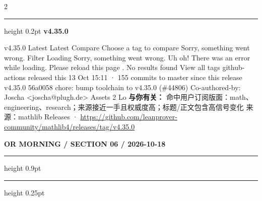\documentclass[10.5pt]{ctexart}
\begin{document}
\begin{multicols}{2}
\vspace{2mm}
\hrule height 0.2pt
\vspace{2mm}
{\large\bfseries v4.35.0}\par
v4.35.0 Latest Latest Compare Choose a tag to compare Sorry, something went wrong. Filter Loading Sorry, something went wrong. Uh oh! There was an error while loading. Please reload this page . No results found View all tags github-actions released this 13 Oct 15:11 · 155 commits to master since this release v4.35.0 56a0058 chore: bump toolchain to v4.35.0 (\#44806) Co-authored-by: Joscha <joscha@plugh.de> Assets 2 Lo
\textbf{与你有关：} 命中用户订阅版面：math、engineering、research；来源接近一手且权威度高；标题/正文包含高信号变化
{\footnotesize\color{ormuted} 来源：mathlib Releases · \url{https://github.com/leanprover-community/mathlib4/releases/tag/v4.35.0}}
\end{multicols}
\newpage
{\small\bfseries OR MORNING / SECTION 06 / 2026-10-18}
\vspace{2mm}
\hrule height 0.9pt
\vspace{1.5mm}
\hrule height 0.25pt
\vspace{4mm}
\end{document}
